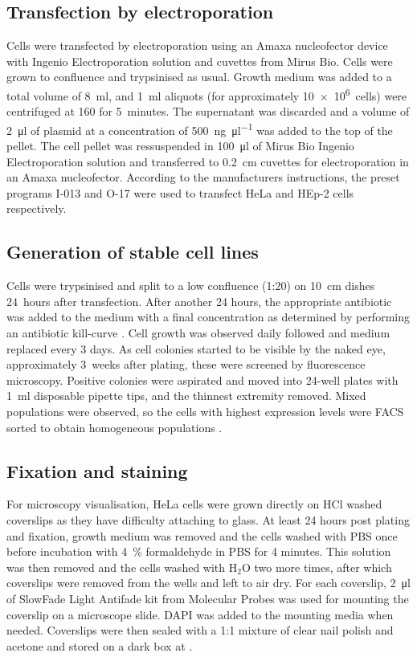     \subsection{Transfection by electroporation}
      Cells were transfected by electroporation using an Amaxa nucleofector
      device with Ingenio Electroporation solution and cuvettes from Mirus Bio.
      Cells were grown to confluence and trypsinised as usual. Growth medium was
      added to a total volume of \SI{8}{\ml}, and \SI{1}{\ml} aliquots (for
      approximately \SI{10e6}{cells}) were centrifuged at \SI{160}{\gn} for 5~minutes.
      The supernatant was discarded and a volume of \SI{2}{\ul} of plasmid at
      a concentration of \SI{500}{\ng\per\ul} was added to the top of the pellet.
      The cell pellet was ressuspended in \SI{100}{\ul} of Mirus Bio Ingenio
      Electroporation solution and transferred to \SI{0.2}{\cm} cuvettes for
      electroporation in an Amaxa nucleofector. According to the manufacturers
      instructions, the preset programs I-013 and O-17 were used to transfect
      HeLa and HEp-2 cells respectively.

    \subsection{Generation of stable cell lines}
      Cells were trypsinised and split to a low confluence (1:20) on
      \SI{10}{\cm} dishes 24~hours after transfection.  After another
      24 hours, the appropriate antibiotic was added to the medium
      with a final concentration as determined by performing an
      antibiotic kill-curve .  Cell
      growth was observed daily followed and medium replaced every 3
      days.  As cell colonies started to be visible by the naked eye,
      approximately 3~weeks after plating, these were screened by
      fluorescence microscopy.  Positive colonies were aspirated and
      moved into 24-well plates with \SI{1}{\ml} disposable pipette
      tips, and the thinnest extremity removed.  Mixed populations
      were observed, so the cells with highest expression levels were
      FACS sorted to obtain homogeneous populations
      .

    \subsection{Fixation and staining}
      For microscopy visualisation, HeLa cells were grown directly
      on HCl washed coverslips as they
      have difficulty attaching to glass. At least 24 hours post
      plating and fixation, growth medium was removed and the cells
      washed with PBS once before incubation with \SI{4}{\percent} formaldehyde in PBS
      for 4 minutes. This solution was then removed
      and the cells washed with H$_2$O two more
      times, after which coverslips were removed from the wells and left to air dry.
      For each coverslip, \SI{2}{\ul} of SlowFade Light Antifade kit from Molecular Probes
      was used for mounting the coverslip on a microscope slide. DAPI was added
      to the mounting media when needed. Coverslips were then sealed with a 1:1
      mixture of clear nail polish and acetone and stored on a dark box at .


